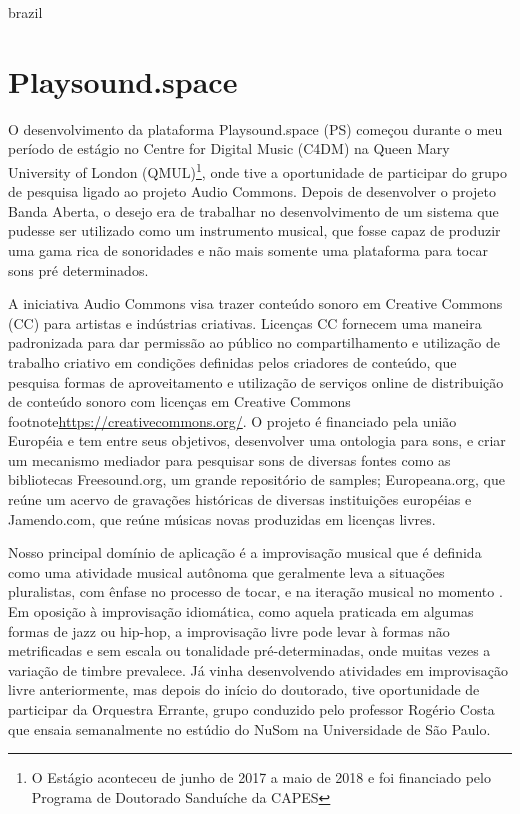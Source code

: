 \begin{otherlanguage*}{brazil}

\section{Playsound.space}

O desenvolvimento da plataforma Playsound.space (PS) começou durante o meu período de estágio no Centre for Digital Music (C4DM) na Queen Mary University of London (QMUL)\footnote{O Estágio aconteceu de junho de 2017 a maio de 2018 e foi financiado pelo Programa de Doutorado Sanduíche da CAPES}, onde tive a oportunidade de participar do grupo de pesquisa ligado ao projeto Audio Commons\cite{Font2016}. Depois de desenvolver o projeto Banda Aberta, o desejo era de trabalhar no desenvolvimento de um sistema que pudesse ser utilizado como um instrumento musical, que fosse capaz de produzir uma gama rica de sonoridades e não mais somente uma plataforma para tocar sons pré determinados. 

A iniciativa Audio Commons visa trazer conteúdo sonoro em Creative Commons (CC) para artistas e indústrias criativas. Licenças CC fornecem uma maneira padronizada para dar permissão ao público no compartilhamento e utilização de trabalho criativo em condições definidas pelos criadores de conteúdo, que pesquisa formas de aproveitamento e utilização de serviços online de distribuição de conteúdo sonoro com licenças em Creative Commons footnote{\url{https://creativecommons.org/}}. O projeto é financiado pela união Européia e tem entre seus objetivos, desenvolver uma ontologia para sons, e criar um mecanismo mediador para pesquisar sons de diversas fontes como as bibliotecas Freesound.org, um grande repositório de samples; Europeana.org, que reúne um acervo de gravações históricas de diversas instituições européias e Jamendo.com, que reúne músicas novas produzidas em licenças livres.


Nosso principal domínio de aplicação é a improvisação musical que é definida como uma atividade musical autônoma \cite{Canonne2016} que geralmente leva a situações pluralistas, com ênfase no processo de tocar, e na iteração musical no momento \cite{BERGSTROEM-NIELSEN2016}. Em oposição à improvisação idiomática, como aquela praticada em algumas formas de jazz ou hip-hop, a improvisação livre pode levar à formas não metrificadas e sem escala ou tonalidade pré-determinadas, onde muitas vezes a variação de timbre prevalece\cite{Barthet:11a}. Já vinha desenvolvendo atividades em improvisação livre anteriormente, mas depois do início do doutorado, tive oportunidade de participar da Orquestra Errante, grupo conduzido pelo professor Rogério Costa que ensaia semanalmente no estúdio do NuSom na Universidade de São Paulo. 


\end{otherlanguage*}
